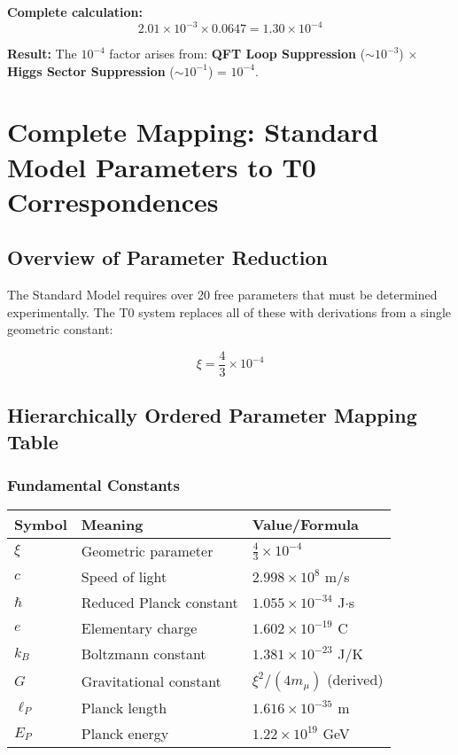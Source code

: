 \documentclass[12pt,a4paper]{article}
\begin{document}
	\textbf{Complete calculation:}
	\begin{equation}
		2.01 \times 10^{-3} \times 0.0647 = 1.30 \times 10^{-4}
	\end{equation}
	
	\textbf{Result:}
	The $10^{-4}$ factor arises from: \textbf{QFT Loop Suppression} ($\sim 10^{-3}$) $\times$ \textbf{Higgs Sector Suppression} ($\sim 10^{-1}$) = $10^{-4}$.
	
	\section{Complete Mapping: Standard Model Parameters to T0 Correspondences}
	
	\subsection{Overview of Parameter Reduction}
	
	The Standard Model requires over 20 free parameters that must be determined experimentally. The T0 system replaces all of these with derivations from a single geometric constant:
	
	\begin{equation}
		\boxed{\xi = \frac{4}{3} \times 10^{-4}}
	\end{equation}
	
	\subsection{Hierarchically Ordered Parameter Mapping Table}
	
	\subsubsection{Fundamental Constants}
	\begin{longtable}{lll}
		\toprule
		\textbf{Symbol} & \textbf{Meaning} & \textbf{Value/Formula} \\
		\midrule
		$\xi$ & Geometric parameter & $\frac{4}{3} \times 10^{-4}$ \\
		$c$ & Speed of light & $2.998 \times 10^{8}$ m/s \\
		$\hbar$ & Reduced Planck constant & $1.055 \times 10^{-34}$ J$\cdot$s \\
		$e$ & Elementary charge & $1.602 \times 10^{-19}$ C \\
		$k_B$ & Boltzmann constant & $1.381 \times 10^{-23}$ J/K \\
		$G$ & Gravitational constant & $\xi^2/(4m_\mu)$ (derived) \\
		$\ell_P$ & Planck length & $1.616 \times 10^{-35}$ m \\
		$E_P$ & Planck energy & $1.22 \times 10^{19}$ GeV \\
		\bottomrule
	\end{longtable}
	
\end{document}
